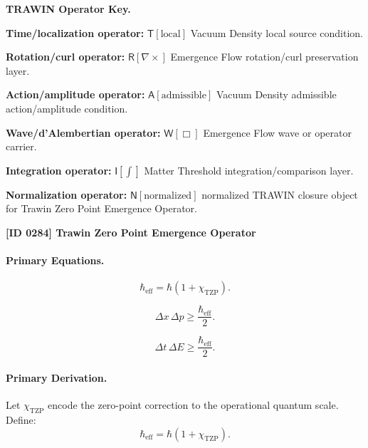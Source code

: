 \par\vspace{0.45\baselineskip}
\noindent\begin{minipage}[t]{\linewidth}
\begingroup
\small
\raggedright
\textbf{TRAWIN Operator Key.}\par
\noindent\textbf{Time/localization operator:} $\mathsf{T}\!\left[\mathrm{local}\right]$ Vacuum Density local source condition.\par
\noindent\textbf{Rotation/curl operator:} $\mathsf{R}\!\left[\nabla\times\right]$ Emergence Flow rotation/curl preservation layer.\par
\noindent\textbf{Action/amplitude operator:} $\mathsf{A}\!\left[\mathrm{admissible}\right]$ Vacuum Density admissible action/amplitude condition.\par
\noindent\textbf{Wave/d'Alembertian operator:} $\mathsf{W}\!\left[\Box\right]$ Emergence Flow wave or operator carrier.\par
\noindent\textbf{Integration operator:} $\mathsf{I}\!\left[\int\right]$ Matter Threshold integration/comparison layer.\par
\noindent\textbf{Normalization operator:} $\mathsf{N}\!\left[\mathrm{normalized}\right]$ normalized TRAWIN closure object for Trawin Zero Point Emergence Operator.\par
\endgroup
\end{minipage}

\clearpage
\noindent\textbf{[ID 0284] Trawin Zero Point Emergence Operator}\par
\vspace{0.35em}
\paragraph{Primary Equations.}
\begin{equation}
\hbar_{\mathrm{eff}}
=
\hbar(1+\chi_{\mathrm{TZP}}).
\end{equation}

\begin{equation}
\Delta x\,\Delta p
\geq
\frac{\hbar_{\mathrm{eff}}}{2}.
\end{equation}

\begin{equation}
\Delta t\,\Delta E
\geq
\frac{\hbar_{\mathrm{eff}}}{2}.
\end{equation}

\paragraph{Primary Derivation.}
Let $\chi_{\mathrm{TZP}}$ encode the zero-point correction to the operational quantum scale.  
Define:
\begin{equation}
\hbar_{\mathrm{eff}}
=
\hbar(1+\chi_{\mathrm{TZP}}).
\end{equation}

